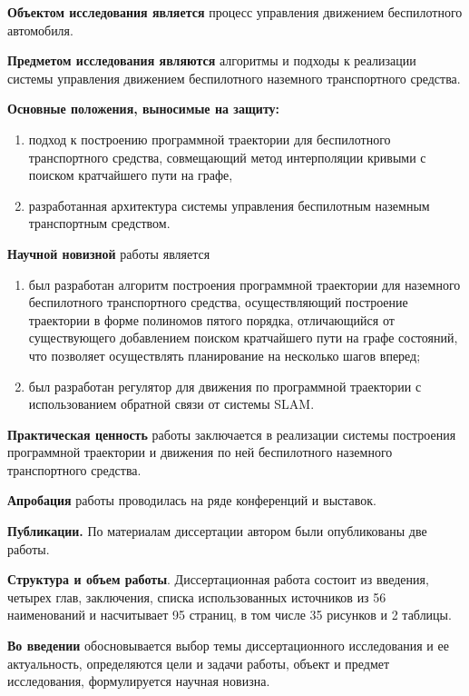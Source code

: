 \textbf{Объектом исследования является} процесс управления движением беспилотного автомобиля.

\textbf{Предметом исследования являются} алгоритмы и подходы к реализации системы управления движением
беспилотного наземного транспортного средства.

\textbf{Основные положения, выносимые на защиту:}
\begin{enumerate}
    \item подход к построению программной траектории для беспилотного транспортного средства, совмещающий метод
          интерполяции кривыми с поиском кратчайшего пути на графе,
    \item разработанная архитектура системы управления беспилотным наземным транспортным средством.
\end{enumerate}

\textbf{Научной новизной} работы является
\begin{enumerate}
    \item был разработан алгоритм построения программной траектории для наземного беспилотного транспортного
          средства, осуществляющий построение траектории в форме полиномов пятого порядка, отличающийся от существующего
          добавлением поиском кратчайшего пути на графе состояний, что позволяет осуществлять планирование на несколько
          шагов вперед;
    \item был разработан регулятор для движения по программной траектории с использованием обратной связи
          от системы SLAM.
\end{enumerate}

\textbf{Практическая ценность} работы заключается в реализации системы построения программной
траектории и движения по ней беспилотного наземного транспортного средства.

\textbf{Апробация} работы проводилась на ряде конференций и выставок.

\textbf{Публикации.} По материалам диссертации автором были опубликованы две работы.

\textbf{Структура и объем работы}. Диссертационная работа состоит из введения, четырех глав, заключения,
списка использованных источников из 56 наименований и насчитывает 95 страниц, в том числе 35
рисунков и 2 таблицы.

\textbf{Во введении} обосновывается выбор темы диссертационного исследования и ее актуальность,
определяются цели и задачи работы, объект и предмет исследования, формулируется научная новизна.

